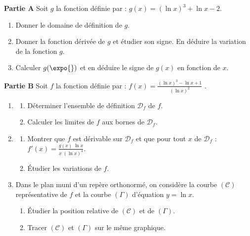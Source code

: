 \begin{exo}
\label{exo:el ln cube}
\textbf{Partie A}
Soit $g$ la fonction d\'efinie par : $g(x) = (\ln x)^3 + \ln x - 2$.
\begin{enumerate}
\item Donner le domaine de d\'efinition de $g$.
\item Donner la fonction d\'eriv\'ee de $g$ et \'etudier son signe.
      En d\'eduire la variation de la fonction $g$.
\item Calculer $g(\expo{})$ et en d\'eduire le signe de $g(x)$ en fonction de $x$.
\end{enumerate}
\textbf{Partie B}
Soit $f$ la fonction d\'efinie par : $ f(x) = \frac{(\ln x)^3 - \ln x + 1}{(\ln x)^2}$ .
\begin{enumerate}
\item
      \begin{enumerate}
      \item D\'eterminer l'ensemble de d\'efinition $\mathcal{D}_f$ de $f$.
      \item Calculer les limites de $f$ aux bornes de $\mathcal{D}_f$.
      \end{enumerate}
\item
      \begin{enumerate}
      \item Montrer que $f$ est d\'erivable sur $\mathcal{D}_f$ et que pour tout $x$ de $\mathcal{D}_f$ :
            $f'(x) = \frac{g(x) \; \ln x}{x \; (\ln x)^4}$.
      \item \'Etudier les variations de $f$.
      \end{enumerate}
\item Dans le plan muni d'un rep\`ere orthonorm\'e,
      on consid\`ere la courbe $(\mathscr{C})$ repr\'esentative de $f$ et la courbe $(\Gamma)$ d'\'equation $y = \ln x$.
      \begin{enumerate}
      \item \'Etudier la position relative de $(\mathscr{C})$ et de $(\Gamma)$.
      \item Tracer $(\mathscr{C})$ et $(\Gamma)$ sur le m\^eme graphique.
      \end{enumerate}
\end{enumerate}
\end{exo}

